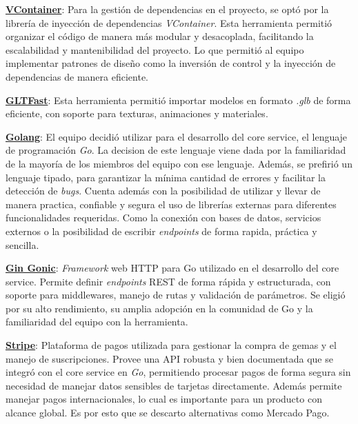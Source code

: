 \vspace{0.25cm}

\textbf{\underline{VContainer}}:
Para la gestión de dependencias en el proyecto, se optó por la librería de inyección de dependencias \textit{VContainer}.
Esta herramienta permitió organizar el código de manera más modular y desacoplada, facilitando la escalabilidad y mantenibilidad del proyecto. 
Lo que permitió al equipo implementar patrones de diseño como la inversión de control y la inyección de dependencias de manera eficiente.

\vspace{0.25cm}

\textbf{\underline{GLTFast}}: 
Esta herramienta permitió importar modelos en formato \textit{.glb} de forma eficiente, con soporte para texturas, 
animaciones y materiales.


\vspace{0.25cm}

\textbf{\underline{Golang}}: El equipo decidió utilizar para el desarrollo del core service, el lenguaje de programación 
\textit{Go}. La decision de este lenguaje viene dada por la familiaridad de la mayoría de los miembros del equipo con
ese lenguaje. Además, se prefirió un lenguaje tipado, para garantizar la mínima cantidad de errores y facilitar la detección
de \textit{bugs}. Cuenta además con la posibilidad de utilizar y llevar de manera practica, confiable y segura el uso de librerías
externas para diferentes funcionalidades requeridas. Como la conexión con bases de datos, servicios externos o la posibilidad 
de escribir \textit{endpoints} de forma rapida, práctica y sencilla.

\vspace{0.25cm}

\textbf{\underline{Gin Gonic}}: \textit{Framework} web HTTP para Go utilizado en el desarrollo del core service. Permite 
definir \textit{endpoints} REST de forma rápida y estructurada, con soporte para middlewares, manejo de rutas y validación 
de parámetros. Se eligió por su alto rendimiento, su amplia adopción en la comunidad de Go y la familiaridad del equipo con 
la herramienta.

\vspace{0.25cm}

\textbf{\underline{Stripe}}: Plataforma de pagos utilizada para gestionar la compra de gemas y el manejo de suscripciones. 
Provee una API robusta y bien documentada que se integró con el core service en \textit{Go}, permitiendo procesar pagos de 
forma segura sin necesidad de manejar datos sensibles de tarjetas directamente. Además permite manejar pagos internacionales, 
lo cual es importante para un producto con alcance global. Es por esto que se descarto alternativas como Mercado Pago.

